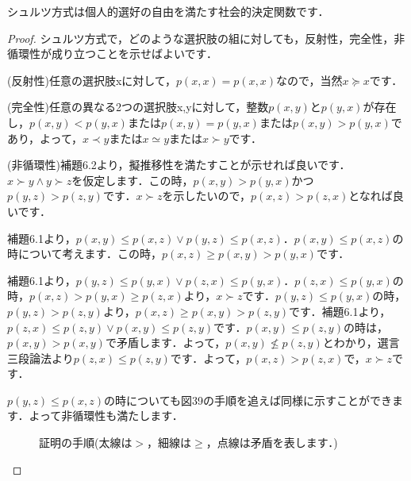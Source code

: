 \begin{thm}
    シュルツ方式は個人的選好の自由を満たす社会的決定関数です．
\end{thm}

\begin{proof}
シュルツ方式で，どのような選択肢の組に対しても，反射性，完全性，非循環性が成り立つことを示せばよいです．

(反射性)任意の選択肢xに対して，$p(x,x) = p(x,x)$なので，当然$x \succeq x$です．

(完全性)任意の異なる2つの選択肢x,yに対して，整数$p(x,y)$と$p(y,x)$が存在し，$p(x,y) < p(y,x)$または$p(x,y) = p(y,x)$または$p(x,y) > p(y,x)$であり，よって，$x \prec y$または$x \simeq y$または$x \succ y$です．

(非循環性)補題6.2より，擬推移性を満たすことが示せれば良いです．$x \succ y \land y \succ z$を仮定します．この時，$p(x,y) > p(y,x)$かつ$p(y,z) > p(z,y)$です．$x \succ z$を示したいので，$p(x,z) > p(z,x)$となれば良いです．

補題6.1より，$p(x,y) \leq p(x,z) \lor p(y,z) \leq p(x,z)$．$p(x,y) \leq p(x,z)$の時について考えます．この時，$p(x,z) \geq p(x,y) > p(y,x)$です．

補題6.1より，$p(y,z) \leq p(y,x) \lor p(z,x) \leq p(y,x)$．$p(z,x) \leq p(y,x)$の時，$p(x,z) > p(y,x) \geq p(z,x)$より，$x \succ z$です．$p(y,z) \leq p(y,x)$の時，$p(y,z) > p(z,y)$より，$p(x,z) \geq p(x,y) > p(z,y)$です．補題6.1より，$p(z,x) \leq p(z,y) \lor p(x,y) \leq p(z,y)$です．$p(x,y) \leq p(z,y)$の時は，$p(x,y) > p(x,y)$で矛盾します．よって，$p(x,y) \not \leq p(z,y)$とわかり，選言三段論法より$p(z,x) \leq p(z,y)$です．よって，$p(x,z) > p(z,x)$で，$x \succ z$です．

$p(y,z) \leq p(x,z)$の時についても図39の手順を追えば同様に示すことができます．よって非循環性も満たします．

\begin{figure}[!h]
    \centering
    \caption{証明の手順(太線は$>$，細線は$\geq$，点線は矛盾を表します．)}
\end{figure}
\end{proof}
